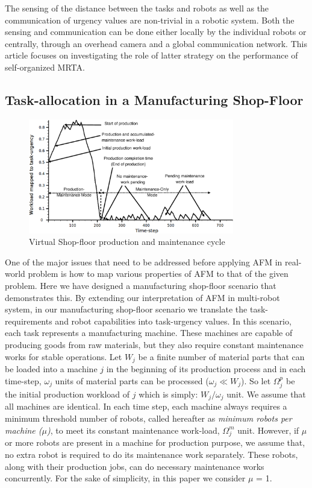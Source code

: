 \documentclass[smallcondensed]{svjour3}
\begin{document}
The sensing of the distance between the tasks and robots as well as the communication of urgency values are non-trivial in a robotic system.  Both the sensing and communication can be done either locally by the individual robots or centrally, through an overhead camera and a global communication network.
This article focuses on investigating the role of latter strategy on the performance of self-organized MRTA.
\subsection{Task-allocation in a Manufacturing Shop-Floor}
\label{sec:mrta}
\begin{figure}[htp]
\centering
\includegraphics[width=0.8\textwidth, angle=0]
{./images/VSP.eps}
\caption{\small Virtual Shop-floor production and maintenance cycle}
\label{fig:vsp}  %
\end{figure}
One of the major issues that need to be addressed before applying AFM in real-world problem is how to map various properties of AFM to that of the given problem. Here we have designed a manufacturing shop-floor scenario that demonstrates this. By extending our interpretation of AFM in multi-robot system, in our  manufacturing shop-floor  scenario we translate the task-requirements and robot capabilities into task-urgency values. In this scenario, each task represents a manufacturing machine. These machines are capable of producing goods from raw materials, but they also require constant maintenance works for stable operations. Let $W_{j}$ be a finite number of material parts that can be loaded into a machine $j$ in the beginning of its production process and in each time-step, $\omega_{j}$ units of material parts can be processed  ($\omega_{j} \ll W_{j} $). So let $\Omega_{j}^{p}$ be the initial production workload of $j$ which is simply: $W_{j} / \omega_{j}$ unit. We assume that all machines are identical. In each time step, each machine always requires a minimum threshold number of robots, called hereafter as {\em minimum robots per machine ($\mu$)}, to meet its constant maintenance work-load, $\Omega_{j}^{m}$ unit. However, if $\mu$ or more robots are present in a machine for production purpose, we assume that, no extra robot is required to do its maintenance work separately. These robots, along with their production jobs, can do necessary maintenance works concurrently. For the sake of simplicity, in this paper we consider $\mu$ = 1.
\end{document}
